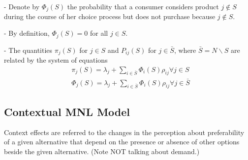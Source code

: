 \documentclass[11pt]{elegantbook}
\begin{document}
- Denote by $\Phi_{j}(S)$ the probability that a consumer considers product $j \notin S$ during the course of her choice process but does not purchase because $j \notin S$.

- By definition, $\Phi_{j}(S)=0$ for all $j \in S$.

- The quantities $\pi_{j}(S)$ for $j \in S$ and $P_{i j}(S)$ for $j \in \bar{S}$, where $\bar{S}=N \backslash S$ are related by the system of equations
$$
\begin{aligned}
&\pi_{j}(S)=\lambda_{j}+\sum_{i \in \bar{S}} \Phi_{i}(S) \rho_{i j} \forall j \in S \\
&\Phi_{j}(S)=\lambda_{j}+\sum_{i \in \bar{S}} \Phi_{i}(S) \rho_{i j} \forall j \in \bar{S}
\end{aligned}
$$

\subsection{Contextual MNL Model}
\begin{definition}
    Context effects are referred to the changes in the perception about preferability of a given alternative that depend on the presence or absence of other options beside the given alternative. (Note NOT talking about demand.)
\end{definition}
\end{document}
